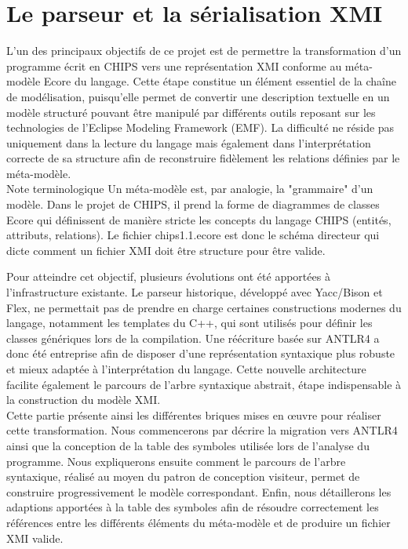 \section{Le parseur et la sérialisation XMI}
\label{sec:parseur_XMI}

L'un des principaux objectifs de ce projet est de permettre la transformation d'un programme écrit en CHIPS vers une représentation XMI conforme au méta-modèle Ecore du langage. Cette étape constitue un élément essentiel de la chaîne de modélisation, puisqu'elle permet de convertir une description textuelle en un modèle structuré pouvant être manipulé par différents outils reposant sur les technologies de l'Eclipse Modeling Framework (EMF). La difficulté ne réside pas uniquement dans la lecture du langage mais également dans l'interprétation correcte de sa structure afin de reconstruire fidèlement les relations définies par le méta-modèle. \\

\RemarkBox
{Note terminologique}
{
Un méta-modèle est, par analogie, la "grammaire" d'un modèle. Dans le projet de CHIPS, il prend la forme de diagrammes de classes Ecore qui définissent de manière stricte les concepts du langage CHIPS (entités, attributs, relations). Le fichier chips1.1.ecore est donc le schéma directeur qui dicte comment un fichier XMI doit être structure pour être valide.
}

Pour atteindre cet objectif, plusieurs évolutions ont été apportées à l'infrastructure existante. Le parseur historique, développé avec Yacc/Bison et Flex, ne permettait pas de prendre en charge certaines constructions modernes du langage, notamment les templates du C++, qui sont utilisés pour définir les classes génériques lors de la compilation. Une réécriture basée sur ANTLR4 a donc été entreprise afin de disposer d'une représentation syntaxique plus robuste et mieux adaptée à l'interprétation du langage. Cette nouvelle architecture facilite également le parcours de l'arbre syntaxique abstrait, étape indispensable à la construction du modèle XMI. \\

Cette partie présente ainsi les différentes briques mises en œuvre pour réaliser cette transformation. Nous commencerons par décrire la migration vers ANTLR4 ainsi que la conception de la table des symboles utilisée lors de l'analyse du programme. Nous expliquerons ensuite comment le parcours de l'arbre syntaxique, réalisé au moyen du patron de conception visiteur, permet de construire progressivement le modèle correspondant. Enfin, nous détaillerons les adaptions apportées à la table des symboles afin de résoudre correctement les références entre les différents éléments du méta-modèle et de produire un fichier XMI valide. \\

